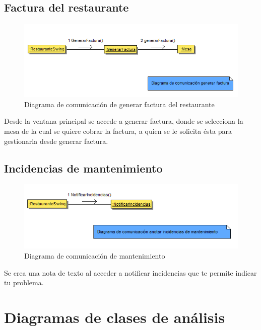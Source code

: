 \documentclass[spanish,a4paper,11pt, twoside]{report}	%
\begin{document}
		\subsection{Factura del restaurante}

		\begin{figure}[!h]
		\centering
		\includegraphics[scale=0.5]{DCfactura.png}
		\caption{Diagrama de comunicación de generar factura del restaurante }
		\end{figure}
		Desde la ventana principal se accede a generar factura, donde se selecciona la mesa de la cual se quiere cobrar 
		la factura, a quien se le solicita ésta para gestionarla desde generar factura.

		\subsection{Incidencias de mantenimiento}

		\begin{figure}[!h]
		\centering
		\includegraphics[scale=0.5]{DCanotarincidencias.png}
		\caption{Diagrama de comunicación de mantenimiento}
		\end{figure}
		Se  crea una nota de texto al acceder a notificar incidencias que te permite indicar tu problema.





	\section{Diagramas de clases de análisis}
\end{document}
